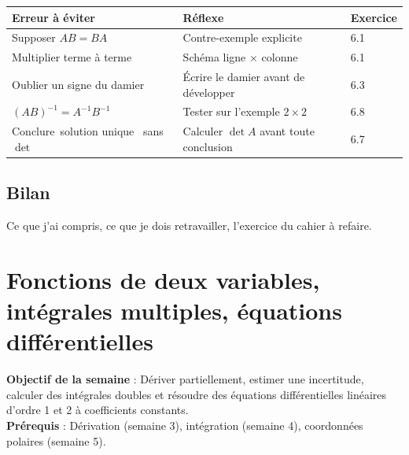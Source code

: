 \documentclass[10.5pt,a4paper]{article}
\newif\ifprof
\providecommand{\og}{\guillemotleft\,}\providecommand{\fg}{\,\guillemotright}
\newcommand{\horsprog}{\textsf{\textcolor{ardoise}{[HORS PROGRAMME]}}}
\newcommand{\synth}{\textsf{\textcolor{ardoise}{(synthèse)}}}
\newcommand{\profonly}[1]{\ifprof #1\fi}
\newcommand{\titrecourant}{Guide de séquence}
\begin{document}
\else
\begin{longtable}{@{}p{7.2cm}p{7.2cm}p{1.6cm}@{}}
\toprule \textbf{Erreur à éviter} & \textbf{Réflexe} & \textbf{Exercice}\\ \midrule\endhead
Supposer $AB=BA$ & Contre-exemple explicite & 6.1\\
Multiplier terme à terme & Schéma ligne $\times$ colonne & 6.1\\
Oublier un signe du damier & Écrire le damier avant de développer & 6.3\\
$(AB)^{-1}=A^{-1}B^{-1}$ & Tester sur l'exemple $2\times2$ & 6.8\\
Conclure \og solution unique \fg{} sans $\det$ & Calculer $\det A$ avant toute conclusion & 6.7\\
\bottomrule\end{longtable}
\fi
\profonly{\subsection{Différenciation et variante FLE/FLS}
Étayage : grille ligne $\times$ colonne préimprimée. Niveaux : 6.1 (socle), 6.4 (intermédiaire), 6.7 (approfondissement). Extension : valeurs propres (annexe, \horsprog). FLE/FLS : lexique déterminant/determinant, comatrice/cofactor matrix, système dégénéré/degenerate system.
\subsection{Évaluation}
Contrôle du cahier \S6.6 (20 points). Aucune question sur la diagonalisation. Barème et corrigé : voir le cahier. Les causes d'erreur ci-dessus sont des hypothèses didactiques, non des constats \synth.}
\subsection{Bilan}
\ifprof À renseigner après la semaine : notions mal acquises, temps réel, réajustements.\else Ce que j'ai compris, ce que je dois retravailler, l'exercice du cahier à refaire.\fi
\clearpage
\section{Fonctions de deux variables, intégrales multiples, équations différentielles}
\renewcommand{\titrecourant}{Semaine 7}
\begin{objectif}\textbf{Objectif de la semaine} : Dériver partiellement, estimer une incertitude, calculer des intégrales doubles et résoudre des équations différentielles linéaires d'ordre 1 et 2 à coefficients constants.\\\textbf{Prérequis} : Dérivation (semaine 3), intégration (semaine 4), coordonnées polaires (semaine 5).\end{objectif}
\end{document}
